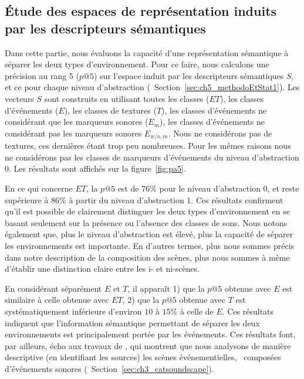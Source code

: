 \subsection{Étude des espaces de représentation induits par les descripteurs sémantiques}

Dans cette partie, nous évaluons la capacité d'une représentation sémantique à séparer les deux types d'environnement. Pour ce faire, nous calculons une précision au rang 5 ($p@5$) sur l'espace induit par les descripteurs sémantiques $S$, et ce pour chaque niveau d'abstraction (\cf~Section~\ref{sec:ch5_methodoEtStat1}). Les vecteurs $S$ sont construits en utilisant toutes les classes ($ET$), les classes d'événements ($E$), les classes de textures ($T$), les classes d'événements ne considérant que les marqueurs sonores ($E_m$), les classes d'événements ne considérant pas les marqueurs sonores $E_{w/o,m}$. Nous ne considérons pas   de textures, ces dernières étant trop peu nombreuses. Pour les mêmes raisons nous ne considérons pas les classes de marqueurs d'événements du niveau d'abstraction 0. Les résultats sont affichés sur la figure~\ref{fig:pa5}.

En ce qui concerne $ET$, la $p@5$ est de $76\%$ pour le niveau d'abstraction 0, et reste supérieure à $86\%$ à partir du niveau d'abstraction 1. Ces résultats confirment qu'il est possible de clairement distinguer les deux types d'environnement en se basant seulement sur la présence ou l'absence des classes de sons. Nous notons également que, plus le niveau d'abstraction est élevé, plus la capacité de séparer les environnements est importante. En d'autres termes, plus nous sommes précis dans notre description de la composition des scènes, plus nous sommes à même d'établir une distinction claire entre les i- et ni-scènes.

En considérant séparément $E$ et $T$, il apparaît 1) que la $p@5$ obtenue avec $E$ est similaire à celle obtenue avec $ET$, 2) que la $p@5$ obtenue avec $T$ est systématiquement inférieure d'environ $10$ à $15\%$ à celle de $E$. Ces résultats indiquent que l'information sémantique permettant de séparer les deux environnements est principalement portée par les événements. Ces résultats font, par ailleurs, écho aux travaux de  \citep{maffiolo_caracterisation_1999}, qui montrent que nous analysons de manière descriptive (en identifiant les sources) les scènes événementielles, \ie~composées d'événements sonores (\cf~Section~\ref{sec:ch3_catsoundscape}).

